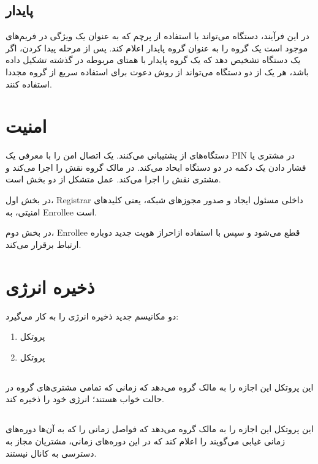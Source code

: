 \subsection{پایدار}
در این فرآیند، دستگاه می‌تواند با استفاده از پرچم 
که به عنوان یک ویژگی در فریم‌های 
موجود است یک گروه را به عنوان گروه پایدار اعلام کند.
پس از مرحله پیدا کردن، اگر یک دستگاه تشخیص دهد که یک گروه پایدار با همتای مربوطه در گذشته تشکیل داده باشد، هر یک از دو دستگاه می‌تواند از روش دعوت
 برای استفاده سریع از گروه مجددا استفاده کنند.
\section{امنیت}
دستگاه‌های
از 
 
پشتیبانی می‌کنند.
یک اتصال امن را با معرفی یک PIN در مشتری یا فشار دادن یک دکمه در دو دستگاه 
 ایحاد می‌کند.
 در 
مالک گروه نقش 
 را اجرا می‌کند و مشتری نقش 
 را اجرا می‌کند. عمل
  متشکل از دو بخش است. 
  
  در بخش اول، Registrar داخلی مسئول ایجاد و صدور مجوزهای شبکه، یعنی کلید‌های امنیتی، به Enrollee است. 
  
  در بخش دوم، Enrollee قطع می‌شود و سپس با استفاده ازاحراز هویت 
  جدید دوباره ارتباط  برقرار می‌کند.

\section{ذخیره انرژی}
دو مکانیسم جدید ذخیره انرژی را به کار می‌گیرد:
\begin{enumerate}
	\item پروتکل 
	\item پروتکل 
	
\end{enumerate}
\subsection{}
این پروتکل این اجازه را به مالک گروه می‌دهد که زمانی که تمامی مشتری‌های گروه در حالت خواب
هستند؛ انرژی خود را ذخیره کند.

\subsection{}
این پروتکل این اجازه را به مالک گروه می‌دهد که فواصل زمانی را که به آن‌ها دوره‌های زمانی غیابی می‌گویند را اعلام کند که در این دوره‌های زمانی، مشتریان مجاز به دسترسی به کانال نیستند.

